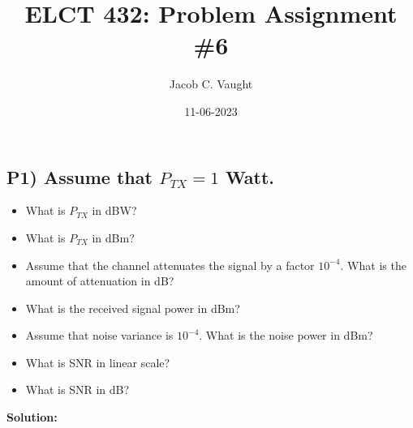 \documentclass{article}
\begin{document}
\title{ELCT 432: Problem Assignment \#6}
\author{Jacob C. Vaught}
\date{11-06-2023}
\maketitle


\subsection*{P1) Assume that \( P_{TX} = 1 \) Watt.}

\begin{itemize}
    \item[a)] What is \( P_{TX} \) in dBW?
    \item[b)] What is \( P_{TX} \) in dBm?
    \item[c)] Assume that the channel attenuates the signal by a factor \( 10^{-4} \). What is the amount of attenuation in dB?
    \item[d)] What is the received signal power in dBm?
    \item[e)] Assume that noise variance is \( 10^{-4} \). What is the noise power in dBm?
    \item[f)] What is SNR in linear scale?
    \item[g)] What is SNR in dB?
\end{itemize}

\textbf{Solution:}
\end{document}
